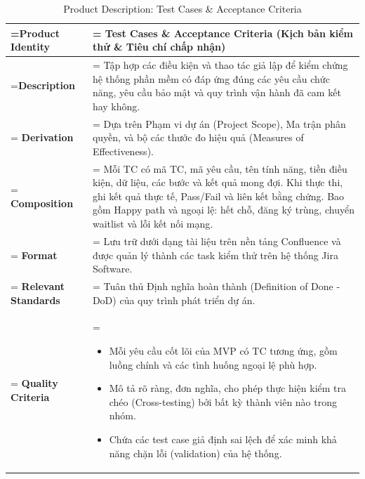 \clearpage
\begin{table}[H]
    \centering
    \caption{Product Description: Test Cases \& Acceptance Criteria}
    \renewcommand{\arraystretch}{1.5}
    \begin{tabularx}{\textwidth}{|>{\hsize=0.5\hsize\linewidth=\hsize\bfseries}X|>{\hsize=1.5\hsize\linewidth=\hsize}X|}
        \hline
        Product Identity & \textbf{Test Cases \& Acceptance Criteria} (Kịch bản kiểm thử \& Tiêu chí chấp nhận) \\
        \hline
        Description & Tập hợp các điều kiện và thao tác giả lập để kiểm chứng hệ thống phần mềm có đáp ứng đúng các yêu cầu chức năng, yêu cầu bảo mật và quy trình vận hành đã cam kết hay không. \\
        \hline
        Derivation & Dựa trên Phạm vi dự án (Project Scope), Ma trận phân quyền, và bộ các thước đo hiệu quả (Measures of Effectiveness). \\
        \hline
        Composition & Mỗi TC có mã TC, mã yêu cầu, tên tính năng, tiền điều kiện, dữ liệu, các bước và kết quả mong đợi. Khi thực thi, ghi kết quả thực tế, Pass/Fail và liên kết bằng chứng. Bao gồm Happy path và ngoại lệ: hết chỗ, đăng ký trùng, chuyển waitlist và lỗi kết nối mạng. \\
        \hline
        Format & Lưu trữ dưới dạng tài liệu trên nền tảng Confluence và được quản lý thành các task kiểm thử trên hệ thống Jira Software. \\
        \hline
        Relevant Standards & Tuân thủ Định nghĩa hoàn thành (Definition of Done - DoD) của quy trình phát triển dự án. \\
        \hline
        Quality Criteria & 
        \vspace{-0.8em}
        \begin{itemize}[leftmargin=*, nosep]
            \item Mỗi yêu cầu cốt lõi của MVP có TC tương ứng, gồm luồng chính và các tình huống ngoại lệ phù hợp.
            \item Mô tả rõ ràng, đơn nghĩa, cho phép thực hiện kiểm tra chéo (Cross-testing) bởi bất kỳ thành viên nào trong nhóm.
            \item Chứa các test case giả định sai lệch để xác minh khả năng chặn lỗi (validation) của hệ thống.
        \end{itemize}
        \vspace{-1em} \\
        \hline
    \end{tabularx}
\end{table}
